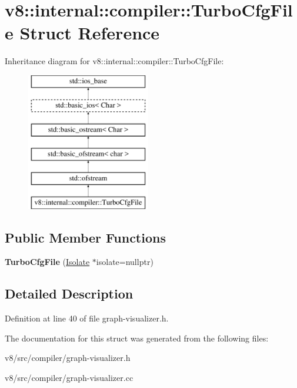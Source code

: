 \hypertarget{structv8_1_1internal_1_1compiler_1_1TurboCfgFile}{}\section{v8\+:\+:internal\+:\+:compiler\+:\+:Turbo\+Cfg\+File Struct Reference}
\label{structv8_1_1internal_1_1compiler_1_1TurboCfgFile}
Inheritance diagram for v8\+:\+:internal\+:\+:compiler\+:\+:Turbo\+Cfg\+File\+:\begin{figure}[H]
\begin{center}
\leavevmode
\includegraphics[height=6.000000cm]{structv8_1_1internal_1_1compiler_1_1TurboCfgFile}
\end{center}
\end{figure}
\subsection*{Public Member Functions}
\begin{DoxyCompactItemize}
\item 
\mbox{\label{structv8_1_1internal_1_1compiler_1_1TurboCfgFile_a69142ec20c772a75a80530c8c9e6867b}} 
{\bfseries Turbo\+Cfg\+File} (\mbox{\hyperlink{classv8_1_1internal_1_1Isolate}{Isolate}} $\ast$isolate=nullptr)
\end{DoxyCompactItemize}


\subsection{Detailed Description}


Definition at line 40 of file graph-\/visualizer.\+h.



The documentation for this struct was generated from the following files\+:\begin{DoxyCompactItemize}
\item 
v8/src/compiler/graph-\/visualizer.\+h\item 
v8/src/compiler/graph-\/visualizer.\+cc\end{DoxyCompactItemize}
